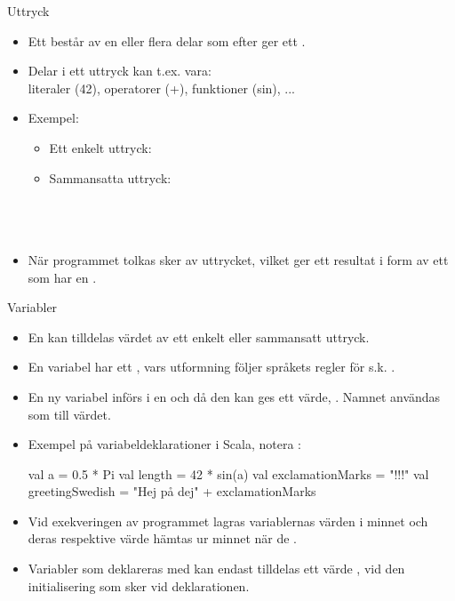 \documentclass{simpleslides}
\begin{document}
  
  \begin{Slide}{Uttryck}
  \begin{itemize}
  \item Ett  består av en eller flera delar som efter  ger ett .
  \item Delar i ett uttryck kan t.ex. vara: \\ literaler (42), operatorer (+), funktioner (sin), ...
  \item Exempel:
  \begin{itemize}
  \item Ett enkelt uttryck: \\ 
  \item Sammansatta uttryck: \\
   \\
   \\
   \\
  \end{itemize}
  
  \item När programmet tolkas sker  av uttrycket, vilket ger ett resultat i form av ett  som har en .
  \end{itemize}
  \end{Slide}
  
  
  \begin{Slide}{Variabler}\SlideFontSmall
  \begin{itemize}
  \item En  kan tilldelas värdet av ett enkelt eller sammansatt uttryck.
  \item En variabel har ett , vars utformning följer språkets regler för s.k. .
  \item En ny variabel införs i en  och då den kan ges ett värde, . Namnet användas som  till värdet.
  \item Exempel på variabeldeklarationer i Scala, notera  :
  \begin{Code}
  val a = 0.5 * Pi
  val length = 42 * sin(a)
  val exclamationMarks = "!!!"
  val greetingSwedish = "Hej på dej" + exclamationMarks
  \end{Code}
  
  \item Vid exekveringen av programmet lagras variablernas värden i minnet och deras respektive värde hämtas ur minnet när de .
  
  \item Variabler som deklareras med  kan endast tilldelas ett värde , vid den initialisering som sker vid deklarationen.
  \end{itemize}
  
  \end{Slide}
  
\end{document}

